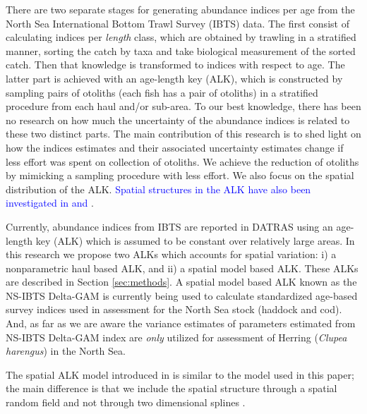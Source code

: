 \documentclass[a4paper 12pt]{article}
\numberwithin{equation}{section}
\newcommand{\nat}[1]{\textcolor{blue}{#1}}
\begin{document}
There are two separate stages for generating abundance indices per age from the North Sea International Bottom Trawl Survey (IBTS) data.  The first consist of calculating indices per \textit{length} class, which are obtained by trawling in a stratified manner, sorting the catch by taxa and take biological measurement of the sorted catch. Then that knowledge is transformed to indices with respect to age. The latter part is achieved with an age-length key (ALK), which is constructed by sampling pairs of otoliths (each fish has a pair of otoliths)  in a stratified procedure from each haul and/or sub-area. To our best knowledge, there has been no research on how much the uncertainty of the abundance indices is related to these two distinct parts. The main contribution of this research is to shed light on how the indices estimates and their associated uncertainty estimates change if less effort was spent on collection of otoliths. We achieve the reduction of otoliths by mimicking a sampling procedure with less effort. We also focus on the spatial distribution of the ALK. \nat{Spatial structures in the ALK have also been investigated in \citet{berg2012spatial} and  \citet{hirst2012bayesian}}.

Currently, abundance indices from IBTS are reported in DATRAS \citep{datras} using an age-length key (ALK) \citep{fridriksson1934calculation} which is assumed to be constant over relatively large areas. In this research we propose two ALKs which accounts for spatial variation: i) a nonparametric  haul based ALK, and ii) a spatial model based ALK. These ALKs are described in Section \ref{sec:methods}. %
A spatial model based ALK \citep{berg2012spatial, berg2014evaluation} known as the NS-IBTS Delta-GAM \citep{ICES2016b} is currently being used to calculate standardized age-based survey indices used in assessment for the North Sea stock (haddock and cod). And, as far as we are aware the variance estimates of parameters estimated from NS-IBTS Delta-GAM index  are \textit{only} utilized for assessment of Herring (\textit{Clupea harengus}) in the North Sea.

The spatial ALK model introduced in \citet{berg2012spatial} is similar to the model used in this paper; the main difference is that we include the spatial structure through a spatial random field \citep{lindgren2011explicit} and not through two dimensional splines \citep{wood2017generalized}.
\end{document}
